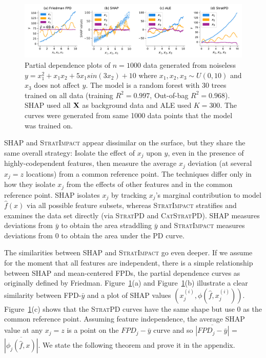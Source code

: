 \documentclass[11pt]{article}
\newcommand{\figref}[1]{Figure~\ref{#1}}
\newcommand{\todo}[1]{{{\small\color{red}{[#1]}}}}
\newcommand{\simp}{\fontfamily{cmr}\textsc{\small StratImpact}}
\newcommand{\spd}{\fontfamily{cmr}\textsc{\small StratPD}}
\newcommand{\cspd}{\fontfamily{cmr}\textsc{\small CatStratPD}}
\begin{document}
\begin{figure}[htbp]
\includegraphics[scale=0.53]{images/FPD-SHAP-PD.pdf}\vspace{-3mm}
\caption{\small Partial dependence plots of $n=1000$ data generated from noiseless $y = x_1^2 + x_1 x_2 + 5 x_1 sin(3 x_2) + 10$ where $x_1,x_2,x_3 \sim U(0,10)$ and $x_3$ does not affect $y$. The model is a random forest with 30 trees trained on all data (training $R^2=0.997$, Out-of-bag $R^2=0.968$). SHAP used all $\bf X$ as background data and ALE used $K=300$. The curves were generated from same 1000 data points that the model was trained on. \todo{ALE needed here? move to ALE discussion?}
}
\label{fig:FPD_vs_SHAP}
\end{figure}

SHAP and \simp{} appear dissimilar on the surface, but they share the same overall strategy: Isolate the effect of $x_j$ upon $y$, even in the presence of highly-codependent features, then measure the average $x_j$ deviation (at several $x_j=z$ locations) from a common reference point. The techniques differ only in how they isolate $x_j$ from the effects of other features and in the common reference point. SHAP isolates $x_j$ by tracking $x_j$'s marginal contribution to model $\hat{f}(x)$ via all possible feature subsets, whereas \simp{} stratifies and examines the data set directly (via \spd{} and \cspd). SHAP measures deviations from $\bar{y}$ to obtain the area straddling $\bar{y}$ and \simp{} measures deviations from 0 to obtain the area under the PD curve.

The similarities between SHAP and \simp{} go even deeper.  If we assume for the moment that all features are independent, there is a simple relationship between SHAP and mean-centered FPDs, the partial dependence curves as originally defined by Friedman.  \figref{fig:FPD_vs_SHAP}(a) and \figref{fig:FPD_vs_SHAP}(b) illustrate a clear similarity between FPD-$\bar{y}$ and a plot of SHAP values $(x_j^{(i)}, \phi(\hat{f},x_j^{(i)}))$. \figref{fig:FPD_vs_SHAP}(c) shows that the \spd{} curves have the same shape but use 0 as the common reference point.   Assuming feature independence, the average SHAP value at any $x_j = z$ is a point on the $FPD_j - \bar{y}$ curve and so $\overline{|FPD_j-\bar{y}|}$ = $\overline{|\phi_j(\hat{f},x)|}$.  We state the following theorem and prove it in the appendix.
\end{document}
